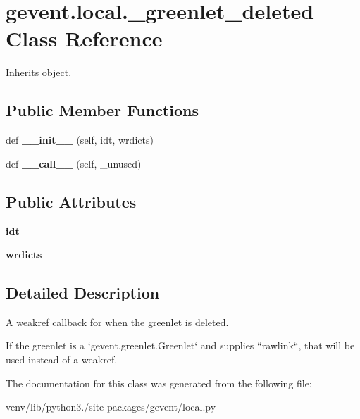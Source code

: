 \hypertarget{classgevent_1_1local_1_1__greenlet__deleted}{}\section{gevent.\+local.\+\_\+greenlet\+\_\+deleted Class Reference}
\label{classgevent_1_1local_1_1__greenlet__deleted}


Inherits object.

\subsection*{Public Member Functions}
\begin{DoxyCompactItemize}
\item 
\mbox{\label{classgevent_1_1local_1_1__greenlet__deleted_af3c0a5c739fd728db626c05272a5fb11}} 
def {\bfseries \+\_\+\+\_\+init\+\_\+\+\_\+} (self, idt, wrdicts)
\item 
\mbox{\label{classgevent_1_1local_1_1__greenlet__deleted_a5a9cbd200a87a0b219a43e203aadb0f3}} 
def {\bfseries \+\_\+\+\_\+call\+\_\+\+\_\+} (self, \+\_\+unused)
\end{DoxyCompactItemize}
\subsection*{Public Attributes}
\begin{DoxyCompactItemize}
\item 
\mbox{\label{classgevent_1_1local_1_1__greenlet__deleted_a0851df3108f192ec253b485840e28df3}} 
{\bfseries idt}
\item 
\mbox{\label{classgevent_1_1local_1_1__greenlet__deleted_a91226071aeef4051409bed86bfa4bf54}} 
{\bfseries wrdicts}
\end{DoxyCompactItemize}


\subsection{Detailed Description}
\begin{DoxyVerb}A weakref callback for when the greenlet
is deleted.

If the greenlet is a `gevent.greenlet.Greenlet` and
supplies ``rawlink``, that will be used instead of a
weakref.
\end{DoxyVerb}
 

The documentation for this class was generated from the following file\+:\begin{DoxyCompactItemize}
\item 
venv/lib/python3./site-\/packages/gevent/local.\+py\end{DoxyCompactItemize}
